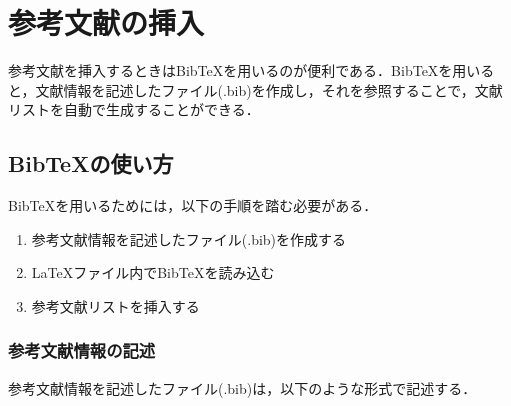 \section{参考文献の挿入}
参考文献を挿入するときはBibTeXを用いるのが便利である．BibTeXを用いると，文献情報を記述したファイル(.bib)を作成し，それを参照することで，文献リストを自動で生成することができる．
\subsection{BibTeXの使い方}
BibTeXを用いるためには，以下の手順を踏む必要がある．
\begin{enumerate}
  \item 参考文献情報を記述したファイル(.bib)を作成する
  \item \LaTeX ファイル内でBibTeXを読み込む
  \item 参考文献リストを挿入する
\end{enumerate}
\subsubsection{参考文献情報の記述}
参考文献情報を記述したファイル(.bib)は，以下のような形式で記述する．
